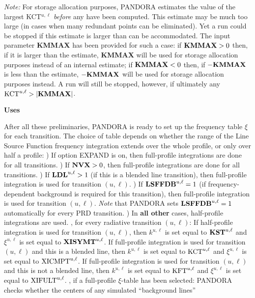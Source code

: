 {\it Note:} For storage allocation purposes, PANDORA estimates the value
of the largest KCT$^{u,\ell}$ {\it before} any have been computed.
This estimate may be much too large (in cases when many
redundant points can be eliminated). Yet a run could be stopped if this
estimate is larger than can be accommodated. The input parameter
{\bf KMMAX} has been provided for such a case: if ${\bf KMMAX} > 0$ then,
if it is larger than the estimate, {\bf KMMAX} will be used for
storage allocation purposes instead of an internal estimate;
if ${\bf KMMAX} < 0$ then, if $-{\bf KMMAX}$ is less than the estimate,
$-{\bf KMMAX}$ will be used for storage allocation purposes instead.
A run will still be stopped, however, if ultimately any
${\rm KCT}^{u,\ell} > |{\bf KMMAX}|$.
\blankline
\blankline
\centerline{\bf Uses}
\blankline
After all these preliminaries, PANDORA is ready to set up the frequency table 
$\xi$ for each transition. The choice of table depends on whether the range of the
Line Source Function frequency integration extends over the whole profile,
or only over half a profile:
) If option EXPAND is on, then full-profile integrations are done for all
transitions.
) If ${\bf NVX} > 0$, then full-profile integrations are done for all
transitions.
) If ${\bf LDL}^{u,\ell} > 1$ (\ie if this is a blended line transition), then
full-profile integration is used for transition $(u,\ell)$.
) If ${\bf LSFFDB}^{u,\ell} = 1$ (\ie if frequency-dependent background is required
for this transition), then full-profile integration is used for transition
$(u,\ell)$.  {\it Note} that PANDORA sets ${\bf LSFFDB}^{u,\ell} = 1$
automatically for every PRD transition.
) In {\bf all other} cases, half-profile integrations are used.
\ej
{}, for every radiative transition $(u,\ell)$:
\spice
If half-profile integration is used for transition $(u,\ell)$, then
$k^{u,\ell}$ is set equal to ${\bf KST}^{u,\ell}$ and $\xi^{u,\ell}$
is set equal to ${\bf XISYMT}^{u,\ell}$.
\spice
If full-profile integration is used for transition $(u,\ell)$ and this
is a blended line, then $k^{u,\ell}$ is set equal to ${\rm KCT}^{u,\ell}$
and $\xi^{u,\ell}$ is set equal to ${\rm XICMPT}^{u,\ell}$.
\spice
If full-profile integration is used for transition $(u,\ell)$ and this
is not a blended line, then $k^{u,\ell}$ is set equal to ${\rm KFT}^{u,\ell}$
and $\xi^{u,\ell}$ is set equal to ${\rm XIFULT}^{u,\ell}$.
\blankline
{}, if a full-profile $\xi$-table has been selected:
\spice
PANDORA checks whether the centers of any simulated ``background lines''
